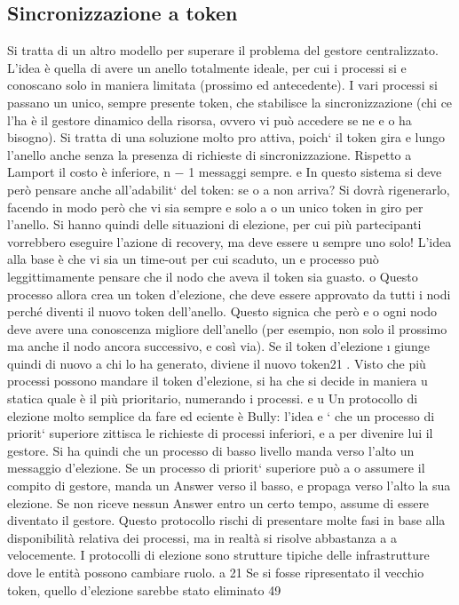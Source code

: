 \subsection{Sincronizzazione a token}
Si tratta di un altro modello per superare il problema del gestore centralizzato. L'idea è quella di avere un anello
totalmente ideale, per cui i processi si
e
conoscano solo in maniera limitata (prossimo ed antecedente). I vari processi
si passano un unico, sempre presente token, che stabilisce la sincronizzazione
(chi ce l'ha è il gestore dinamico della risorsa, ovvero vi può accedere se ne
e
o
ha bisogno). Si tratta di una soluzione molto pro attiva, poich` il token gira
e
lungo l'anello anche senza la presenza di richieste di sincronizzazione. Rispetto
a Lamport il costo è inferiore, n $-$ 1 messaggi sempre.
e
In questo sistema si deve però pensare anche all'adabilit` del token: se
o
a
non arriva? Si dovrà rigenerarlo, facendo in modo però che vi sia sempre e solo
a
o
un unico token in giro per l'anello. Si hanno quindi delle situazioni di elezione,
per cui più partecipanti vorrebbero eseguire l'azione di recovery, ma deve essere
u
sempre uno solo! L'idea alla base è che vi sia un time-out per cui scaduto, un
e
processo può leggittimamente pensare che il nodo che aveva il token sia guasto.
o
Questo processo allora crea un token d'elezione, che deve essere approvato da
tutti i nodi perché diventi il nuovo token dell'anello. Questo signica che però
e
o
ogni nodo deve avere una conoscenza migliore dell'anello (per esempio, non solo
il prossimo ma anche il nodo ancora successivo, e così via). Se il token d'elezione
\i{}
giunge quindi di nuovo a chi lo ha generato, diviene il nuovo token21 . Visto che
più processi possono mandare il token d'elezione, si ha che si decide in maniera
u
statica quale è il più prioritario, numerando i processi.
e
u
Un protocollo di elezione molto semplice da fare ed eciente è Bully: l'idea
e
` che un processo di priorit` superiore zittisca le richieste di processi inferiori,
e
a
per divenire lui il gestore. Si ha quindi che un processo di basso livello manda
verso l'alto un messaggio d'elezione. Se un processo di priorit` superiore può
a
o
assumere il compito di gestore, manda un Answer verso il basso, e propaga verso
l'alto la sua elezione. Se non riceve nessun Answer entro un certo tempo, assume
di essere diventato il gestore. Questo protocollo rischi di presentare molte fasi
in base alla disponibilità relativa dei processi, ma in realtà si risolve abbastanza
a
a
velocemente. I protocolli di elezione sono strutture tipiche delle infrastrutture
dove le entità possono cambiare ruolo.
a
21 Se
si fosse ripresentato il vecchio token, quello d'elezione sarebbe stato eliminato
49
